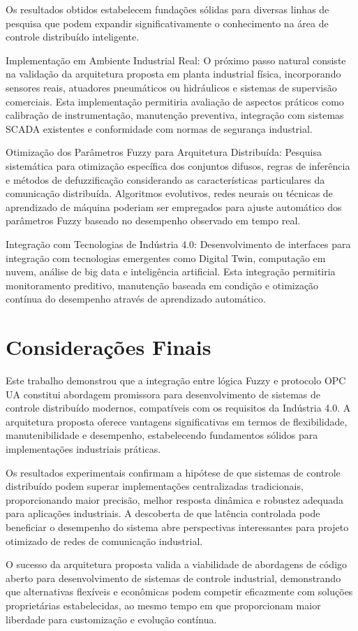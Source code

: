 Os resultados obtidos estabelecem fundações sólidas para diversas linhas de pesquisa que podem expandir significativamente o conhecimento na área de controle distribuído inteligente.

Implementação em Ambiente Industrial Real: O próximo passo natural consiste na validação da arquitetura proposta em planta industrial física, incorporando sensores reais, atuadores pneumáticos ou hidráulicos e sistemas de supervisão comerciais. Esta implementação permitiria avaliação de aspectos práticos como calibração de instrumentação, manutenção preventiva, integração com sistemas SCADA existentes e conformidade com normas de segurança industrial.

Otimização dos Parâmetros Fuzzy para Arquitetura Distribuída: Pesquisa sistemática para otimização específica dos conjuntos difusos, regras de inferência e métodos de defuzzificação considerando as características particulares da comunicação distribuída. Algoritmos evolutivos, redes neurais ou técnicas de aprendizado de máquina poderiam ser empregados para ajuste automático dos parâmetros Fuzzy baseado no desempenho observado em tempo real.

Integração com Tecnologias de Indústria 4.0: Desenvolvimento de interfaces para integração com tecnologias emergentes como Digital Twin, computação em nuvem, análise de big data e inteligência artificial. Esta integração permitiria monitoramento preditivo, manutenção baseada em condição e otimização contínua do desempenho através de aprendizado automático.

\section{Considerações Finais}
\label{consideracoes}

Este trabalho demonstrou que a integração entre lógica Fuzzy e protocolo OPC UA constitui abordagem promissora para desenvolvimento de sistemas de controle distribuído modernos, compatíveis com os requisitos da Indústria 4.0. A arquitetura proposta oferece vantagens significativas em termos de flexibilidade, manutenibilidade e desempenho, estabelecendo fundamentos sólidos para implementações industriais práticas.

Os resultados experimentais confirmam a hipótese de que sistemas de controle distribuído podem superar implementações centralizadas tradicionais, proporcionando maior precisão, melhor resposta dinâmica e robustez adequada para aplicações industriais. A descoberta de que latência controlada pode beneficiar o desempenho do sistema abre perspectivas interessantes para projeto otimizado de redes de comunicação industrial.

O sucesso da arquitetura proposta valida a viabilidade de abordagens de código aberto para desenvolvimento de sistemas de controle industrial, demonstrando que alternativas flexíveis e econômicas podem competir eficazmente com soluções proprietárias estabelecidas, ao mesmo tempo em que proporcionam maior liberdade para customização e evolução contínua.